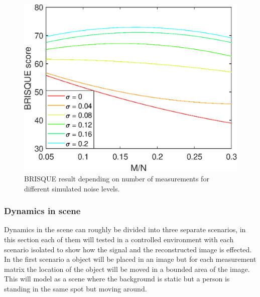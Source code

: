 \begin{figure}[H]
    \centering
    \includegraphics[width = 0.7\linewidth]{result/synt_brisque/Brisque_fit_flat.eps}
    \caption{BRISQUE result depending on number of measurements for different simulated noise levels.}
    \label{fig:Brisque_2d}
\end{figure}



\subsubsection{Dynamics in scene}
Dynamics in the scene can roughly be divided into three separate scenarios, in this section each of them will tested in a controlled environment with each scenario isolated to show how the signal and the reconstructed image is effected.\\[0.1in]

In the first scenario a object will be placed in an image but for each measurement matrix the location of the object will be moved in a bounded area of the image. This will model as a scene where the background is static but a person is standing in the same spot but moving around.

